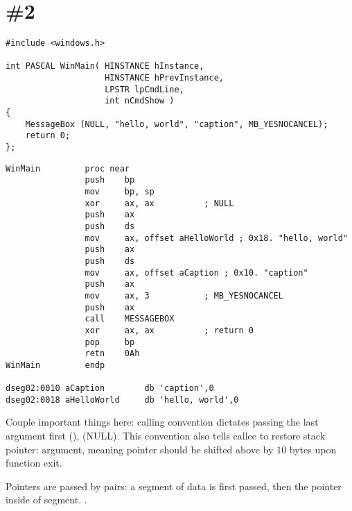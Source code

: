 \section{\Example{} \#2}
\label{win16_messagebox}

\begin{lstlisting}
#include <windows.h>

int PASCAL WinMain( HINSTANCE hInstance,
                    HINSTANCE hPrevInstance,
                    LPSTR lpCmdLine,
                    int nCmdShow )
{
	MessageBox (NULL, "hello, world", "caption", MB_YESNOCANCEL);
	return 0;
};
\end{lstlisting}

\begin{lstlisting}
WinMain         proc near
                push    bp
                mov     bp, sp
                xor     ax, ax          ; NULL
                push    ax
                push    ds
                mov     ax, offset aHelloWorld ; 0x18. "hello, world"
                push    ax
                push    ds
                mov     ax, offset aCaption ; 0x10. "caption"
                push    ax
                mov     ax, 3           ; MB_YESNOCANCEL
                push    ax
                call    MESSAGEBOX
                xor     ax, ax          ; return 0
                pop     bp
                retn    0Ah
WinMain         endp

dseg02:0010 aCaption        db 'caption',0
dseg02:0018 aHelloWorld     db 'hello, world',0
\end{lstlisting}

{Couple important things here:  calling convention dictates passing the last argument first} 
(),  (NULL).
{This convention also tells \gls{callee} to restore} \gls{stack pointer}:
    
{argument, meaning pointer should be shifted above by $10$ bytes upon function exit}.

{Pointers are passed by pairs: a segment of data is first passed, then the pointer inside of segment}.
.


